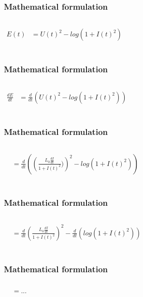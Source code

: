 \documentclass[aspectratio=1610]{beamer}
\begin{document}
\begin{frame}
\frametitle{Mathematical formulation}
\begin{columns}
\column{37em}
\huge
\begin{align*}
E(t) & = U(t)^{2}-log(1+I(t)^{2})\\
\end{align*}
\end{columns}
\end{frame}
\begin{frame}
\frametitle{Mathematical formulation}
\begin{columns}
\column{37em}
\huge
\begin{align*}
\frac{dE}{dt} & = \frac{d}{dt}\left(U(t)^{2}-log(1+I(t)^{2})\right)\\
\end{align*}
\end{columns}
\end{frame}
\begin{frame}
\frametitle{Mathematical formulation}
\begin{columns}
\column{37em}
\huge
\begin{align*}
& = \frac{d}{dt}\left(\left(\frac{L_{0}\frac{dI}{dt}}{1+I(t)^{2}})\right)^{2}-log\left(1+I(t)^{2}\right)\right) \\
\end{align*}
\end{columns}
\end{frame}
\begin{frame}
\frametitle{Mathematical formulation}
\begin{columns}
\column{37em}
\huge
\begin{align*}
& = \frac{d}{dt}\left(\frac{L_{0}\frac{dI}{dt}}{1+I(t)^{2}}\right)^{2}-\frac{d}{dt}\left(log\left(1+I(t)^{2}\right)\right)\\
\end{align*}
\end{columns}
\end{frame}
\begin{frame}
\frametitle{Mathematical formulation}
\begin{columns}
\column{37em}
\huge
\begin{align*}
& = ...
\end{align*}
\end{columns}
\end{frame}
\end{document}
